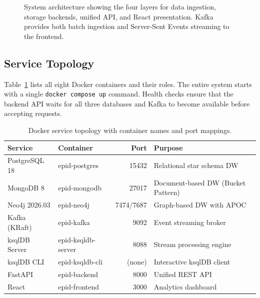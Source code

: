 \documentclass[12pt,a4paper]{article}
\begin{document}
\begin{figure}[H]
\caption{System architecture showing the four layers for data ingestion, storage backends, unified API, and React presentation. Kafka provides both batch ingestion and Server-Sent Events streaming to the frontend.}
\label{fig:architecture}
\end{figure}

\subsection{Service Topology}

Table~\ref{tab:services} lists all eight Docker containers and their roles. The entire system starts with a single \texttt{docker compose up} command. Health checks ensure that the backend API waits for all three databases and Kafka to become available before accepting requests.

\begin{table}[H]
\centering
\caption{Docker service topology with container names and port mappings.}
\label{tab:services}
\begin{tabular}{llrl}
\toprule
\textbf{Service} & \textbf{Container} & \textbf{Port} & \textbf{Purpose} \\
\midrule
PostgreSQL 18 & epid-postgres & 15432 & Relational star schema DW \\
MongoDB 8 & epid-mongodb & 27017 & Document-based DW (Bucket Pattern) \\
Neo4j 2026.03 & epid-neo4j & 7474/7687 & Graph-based DW with APOC \\
Kafka (KRaft) & epid-kafka & 9092 & Event streaming broker \\
ksqlDB Server & epid-ksqldb-server & 8088 & Stream processing engine \\
ksqlDB CLI & epid-ksqldb-cli & (none) & Interactive ksqlDB client \\
FastAPI & epid-backend & 8000 & Unified REST API \\
React & epid-frontend & 3000 & Analytics dashboard \\
\bottomrule
\end{tabular}
\end{table}
\end{document}
